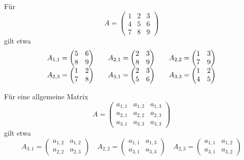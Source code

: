 \begin{beispiel}\label{det_3_bsp_str_1} Für
  	$$ A = \left( \begin{matrix} 1 & 2 & 3 \\ 4 & 5 & 6 \\ 7 & 8 & 9 \end{matrix} \right) $$
gilt etwa
  	$$ \begin{array} {c c c }
     	A_{1,1} = \left( \begin{matrix} 5 & 6 \\ 8 & 9 \end{matrix} \right) \quad &
     	A_{2,1} = \left( \begin{matrix} 2 & 3 \\ 8 & 9 \end{matrix} \right) \quad &
     	A_{2,2} = \left( \begin{matrix} 1 & 3 \\ 7 & 9 \end{matrix} \right) \\
   	A_{2,3} = \left( \begin{matrix} 1 & 2 \\ 7 & 8 \end{matrix} \right) \quad &
 	A_{3,1} = \left( \begin{matrix} 2 & 3 \\ 5 & 6 \end{matrix} \right) \quad &
	A_{3,3} = \left( \begin{matrix} 1 & 2 \\ 4 & 5 \end{matrix} \right) 
	\end{array} $$
\end{beispiel}

\begin{beispiel}\label{det_3_bsp_str_2} Für eine allgemeine Matrix
  	$$ A = \left( \begin{matrix} a_{1,1} & a_{1,2} & a_{1,3} \\ a_{2,1} & a_{2,2} & a_{2,3} \\
	a_{3,1} & a_{3,3} & a_{3,3} \end{matrix} \right) $$
gilt etwa
  	$$ A_{3,1} = \left( \begin{matrix} a_{1,2} & a_{1,2}\\ a_{2,2} & a_{2,3} \end{matrix} \right) \quad 
   	A_{2,2} = \left( \begin{matrix} a_{1,1} & a_{1,3} \\ a_{3,1} & a_{3,3} \end{matrix} \right) \quad
  	A_{2,3} = \left( \begin{matrix} a_{1,1} & a_{1,2} \\ a_{3,1} & a_{3,2} \end{matrix} \right) $$
\end{beispiel}

